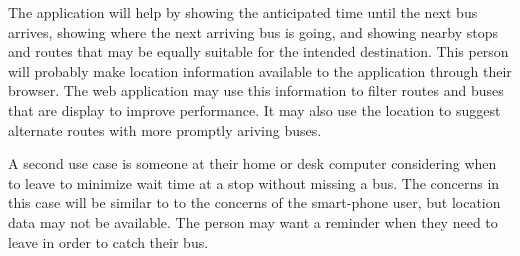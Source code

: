 \documentclass[12pt]{article}
\begin{document}
The application will help by showing the anticipated time until the next bus arrives, showing where the next arriving bus is going, and showing nearby stops and routes that may be equally suitable for the intended destination.  This person will probably make location information available to the application through their browser.  The web application may use this information to filter routes and buses that are display to improve performance.  It may also use the location to suggest alternate routes with more promptly ariving buses. 

A second use case is someone at their home or desk computer considering when to leave to minimize wait time at a stop without missing a bus.  The concerns in this case will be similar to to the concerns of the smart-phone user, but location data may not be available.  The person may want a reminder when they need to leave in order to catch their bus.
	
\end{document}
